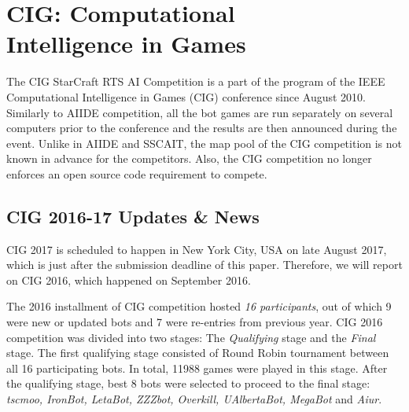 \section{CIG: Computational\\ Intelligence in Games}\label{subsecCIG}

The CIG StarCraft RTS AI Competition is a part of the program of the IEEE Computational Intelligence in Games (CIG) conference since August 2010. 
Similarly to AIIDE competition, all the bot games are run separately on several computers prior to the conference and the results are then announced during the event. 
Unlike in AIIDE and SSCAIT, the map pool of the CIG competition is not known in advance for the competitors. Also, the CIG competition no longer enforces an open source code requirement to compete.

\subsection*{CIG 2016-17 Updates \& News}\label{subsecCIGnews}

CIG 2017 is scheduled to happen in New York City, USA on late August 2017, which is just after the submission deadline of this paper. Therefore, we will report on CIG 2016, which happened on September 2016. 


The 2016 installment of CIG competition hosted {\em 16 participants}, out of which 9 were new or updated bots and 7 were re-entries from previous year. CIG 2016 competition was divided into two stages: The {\em Qualifying} stage and the {\em Final} stage. The first qualifying stage consisted of Round Robin tournament between all 16 participating bots. In total, 11988 games were played in this stage. After the qualifying stage, best 8 bots were selected to proceed to the final stage: {\em tscmoo, IronBot, LetaBot, ZZZbot, Overkill, UAlbertaBot, MegaBot} and {\em Aiur}.

